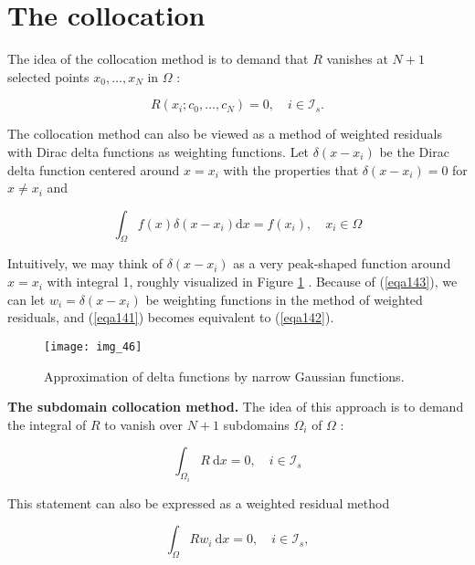 \documentclass[../main.tex]{subfiles}
\begin{document}
\section[The collocation]{The collocation} 
	\label{sec:sec_11_8}
	\noindent The idea of the collocation method is to demand that $R$ vanishes at $N+1$ selected points $x_{0}, \ldots, x_{N}$ in $\Omega$ :
	
	\begin{equation}
		\label{eqa142}
		R\left(x_{i} ; c_{0}, \ldots, c_{N}\right)=0, \quad i \in \mathcal{I}_{s} .
	\end{equation}

	\noindent The collocation method can also be viewed as a method of weighted residuals with Dirac delta functions as weighting functions. Let $\delta\left(x-x_{i}\right)$ be the Dirac delta function centered around $x=x_{i}$ with the properties that $\delta\left(x-x_{i}\right)=0$ for $x \neq x_{i}$ and
	
	\begin{equation}
		\label{eqa143}
		\int_{\Omega} f(x) \delta\left(x-x_{i}\right) \mathrm{d} x=f\left(x_{i}\right), \quad x_{i} \in \Omega
	\end{equation}

	\noindent Intuitively, we may think of $\delta\left(x-x_{i}\right)$ as a very peak-shaped function around $x=x_{i}$ with integral 1, roughly visualized in Figure \ref{fig:img_46} . Because of (\ref{eqa143}), we can let $w_{i}=\delta\left(x-x_{i}\right)$ be weighting functions in the method of weighted residuals, and (\ref{eqa141}) becomes equivalent to (\ref{eqa142}).
	
	\begin{figure}[H]
		\centering
		\texttt{[image: img\_46]}
		\caption{Approximation of delta functions by narrow Gaussian functions.}
		\label{fig:img_46}
	\end{figure}
	
	\noindent \textbf{The subdomain collocation method.} The idea of this approach is to demand the integral of $R$ to vanish over $N+1$ subdomains $\Omega_{i}$ of $\Omega$ :
	
	\begin{equation}
		\label{eqa144}
		\int_{\Omega_{i}} R \mathrm{~d} x=0, \quad i \in \mathcal{I}_{s}
	\end{equation}

	\noindent This statement can also be expressed as a weighted residual method

	\begin{equation}
		\label{eqa145}
		\int_{\Omega} R w_{i} \mathrm{~d} x=0, \quad i \in \mathcal{I}_{s},
	\end{equation}
\end{document}
